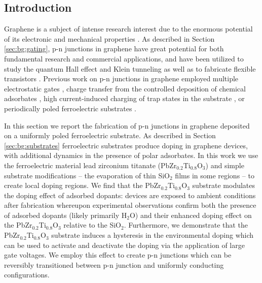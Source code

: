 \documentclass[edeposit,fullpage,draftthesis]{uiucthesis2009}
\begin{document}
    \subsection{Introduction}
    
        Graphene is a subject of intense research interest due to the enormous potential of its 
        electronic and mechanical properties \cite{geim2007rise}. As described in Section
        \ref{sec:bg:gating}, p-n junctions 
        in graphene have great potential for both fundamental research and commercial applications, 
        and have been utilized to study the quantum Hall effect \cite{Williams2007, Ozyilmaz2007, Velasco2010} 
        and Klein tunneling \cite{Stander2009, Young2009} as well as to fabricate flexible 
        transistors \cite{Kim2010}. Previous work on p-n junctions in graphene employed multiple electrostatic gates 
        \cite{Meric2008, Williams2007, Ozyilmaz2007, Huard2007, Liu2008, Stander2009, Velasco2009, Velasco2010, Young2009}, 
        charge transfer from the controlled deposition of chemical adsorbates 
        \cite{Farmer2009,Lohmann2009,Brenner2010,Cheng2011,Sojoudi2012,Seo2014,Park2015}, 
        high current-induced charging of trap states in the substrate \cite{Chiu2010}, 
        or periodically poled ferroelectric substrates \cite{Baeumer2015}.

        In this section we report the fabrication of p-n junctions in graphene deposited on a uniformly 
        poled ferroelectric substrate. As described in Section \ref{sec:bg:substrates}
        ferroelectric substrates produce doping in graphene devices, with additional dynamics
        in the presence of polar adsorbates. In this work we use the ferroelectric material lead zirconium titanate
        (PbZr$_{0.2}$Ti$_{0.8}$O$_3$) and simple substrate modifications -- the evaporation 
        of thin SiO$_2$ films in some regions -- to create local doping regions.
        We find that the PbZr$_{0.2}$Ti$_{0.8}$O$_3$ substrate modulates the doping effect of adsorbed dopants: 
        devices are exposed to ambient conditions after fabrication whereupon experimental observations 
        confirm both the presence of adsorbed dopants (likely primarily H$_2$O) and their enhanced doping
        effect on the PbZr$_{0.2}$Ti$_{0.8}$O$_3$ relative to the SiO$_2$.
        Furthermore, we demonstrate that the PbZr$_{0.2}$Ti$_{0.8}$O$_3$ substrate induces a hysteresis 
        in the environmental doping which can be used to activate and deactivate the doping via the 
        application of large gate voltages. We employ this effect to create p-n junctions which can 
        be reversibly transitioned between p-n junction and uniformly conducting configurations.
\end{document}
